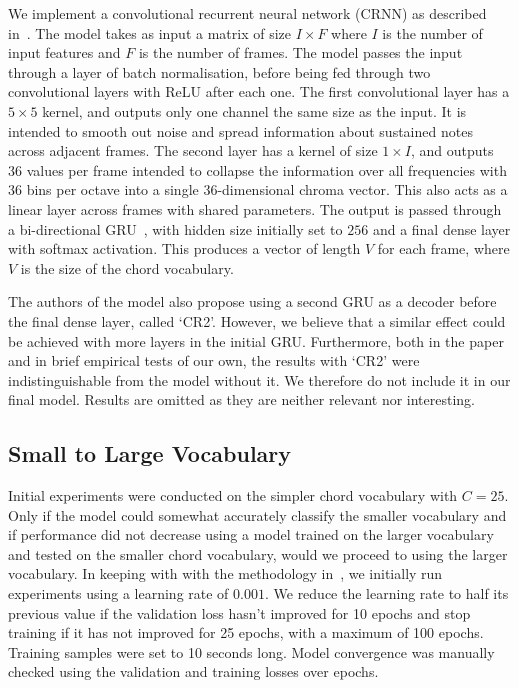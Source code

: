 We implement a convolutional recurrent neural network (CRNN) as described in~\citet{StructuredTraining}. The model takes as input a matrix of size $I \times F$ where $I$ is the number of input features and $F$ is the number of frames. The model passes the input through a layer of batch normalisation, before being fed through two convolutional layers with ReLU after each one. The first convolutional layer has a $5\times 5$ kernel, and outputs only one channel the same size as the input. It is intended to smooth out noise and spread information about sustained notes across adjacent frames. The second layer has a kernel of size $1\times I$, and outputs 36 values per frame intended to collapse the information over all frequencies with 36 bins per octave into a single 36-dimensional chroma vector. This also acts as a linear layer across frames with shared parameters. The output is passed through a bi-directional GRU~\citep{GRU}, with hidden size initially set to $256$ and a final dense layer with softmax activation. This produces a vector of length $V$ for each frame, where $V$ is the size of the chord vocabulary.

The authors of the model also propose using a second GRU as a decoder before the final dense layer, called `CR2'. However, we believe that a similar effect could be achieved with more layers in the initial GRU. Furthermore, both in the paper and in brief empirical tests of our own, the results with `CR2' were indistinguishable from the model without it. We therefore do not include it in our final model. Results are omitted as they are neither relevant nor interesting.

\subsection{Small to Large Vocabulary}

Initial experiments were conducted on the simpler chord vocabulary with $C=25$. Only if the model could somewhat accurately classify the smaller vocabulary and if performance did not decrease using a model trained on the larger vocabulary and tested on the smaller chord vocabulary, would we proceed to using the larger vocabulary. In keeping with with the methodology in~\citet{StructuredTraining}, we initially run experiments using a learning rate of $0.001$. We reduce the learning rate to half its previous value if the validation loss hasn't improved for 10 epochs and stop training if it has not improved for 25 epochs, with a maximum of 100 epochs. Training samples were set to 10 seconds long. Model convergence was manually checked using the validation and training losses over epochs.

